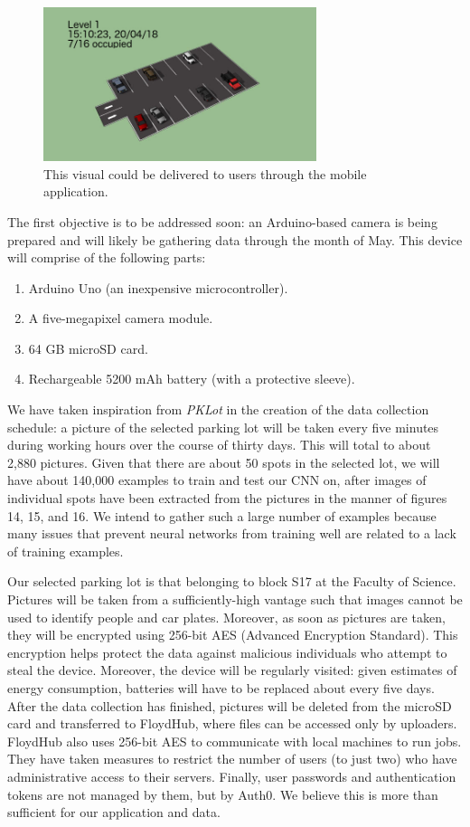 \documentclass[a4paper, 11pt]{article} %
\begin{document}
		\begin{figure}[h]
			\centering
			\includegraphics[width=8cm]{figures/mock-up.jpg}
			\caption{This visual could be delivered to users through the mobile application.}
		\end{figure}
		\newpage
		The first objective is to be addressed soon: an Arduino-based camera is being prepared and will 
		likely be gathering data through the month of May. This device will comprise of the following parts:
		\begin{enumerate}
			\item Arduino Uno (an inexpensive microcontroller).
			\item A five-megapixel camera module.
			\item 64 GB microSD card.
			\item Rechargeable 5200 mAh battery (with a protective sleeve).
		\end{enumerate}

		We have taken inspiration from \textit{PKLot} in the creation of the data collection schedule: a 
		picture of the selected parking lot will be taken every five minutes during working hours over the 
		course of thirty days. This will total to about 2,880 pictures. Given that there are about 50 spots 
		in the selected lot, we will have about 140,000 examples to train and test our CNN on, after images
		of 	individual spots have been extracted from the pictures in the manner of figures 14, 15, and 16. 
		We intend to gather such a large number of examples because many issues that prevent neural 
		networks from training well are related to a lack of training examples.
		
		Our selected parking lot is that belonging to block S17 at the Faculty of Science. Pictures will be 
		taken from a sufficiently-high vantage such that images cannot be used to identify people and car 
		plates. Moreover, as soon as pictures are taken, they will be encrypted using 256-bit AES 
		(Advanced Encryption Standard). This encryption helps protect the data against malicious 
		individuals who attempt to steal the device. Moreover, the device will be regularly visited: given 
		estimates of energy consumption, batteries will have to be replaced about every five days. After 
		the data collection has finished, pictures will be deleted from the microSD card and transferred to 
		FloydHub, where files can be accessed only by uploaders. FloydHub also uses 256-bit AES to 
		communicate with local machines to run jobs. They have taken measures to restrict the number of 
		users (to just two) who have administrative access to their servers. Finally, user passwords and 
		authentication tokens are not managed by them, but by Auth0. We believe this is more than 
		sufficient for our application and data.
		
\end{document}
